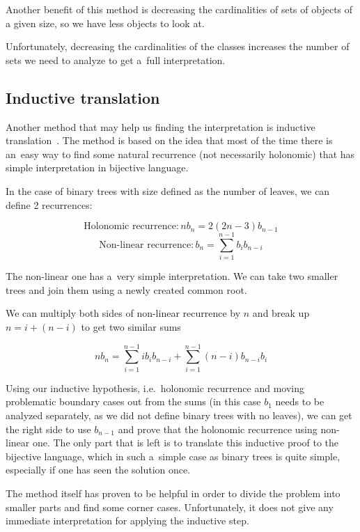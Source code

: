 \documentclass[final]{article}
\theoremstyle{definition}
\theoremstyle{definition}
\theoremstyle{remark}
\begin{document}
Another benefit of this method is decreasing the cardinalities of sets of objects of a given size, so we have less objects to look at.

Unfortunately, decreasing the cardinalities of the classes increases the number of sets we need to analyze to get a~full interpretation.

\subsection{Inductive translation}%
\label{sub:inductive_translation}

Another method that may help us finding the interpretation is inductive translation~\cite{doron}. The method is based on the idea that most of the time there is an~easy way to find some natural recurrence (not necessarily holonomic) that has simple interpretation in bijective language.

In the case of binary trees with size defined as the number of leaves, we can define 2 recurrences:

\[\text{Holonomic recurrence} : n b_{n} = 2 (2n - 3) b_{n - 1}\]
\[\text{Non-linear recurrence} : b_{n} = \sum_{i=1}^{n - 1} b_{i} b_{n - i}\]

The non-linear one has a~very simple interpretation. We can take two smaller trees and join them using a newly created common root.

We can multiply both sides of non-linear recurrence by \(n\) and break up \(n = i + (n - i)\) to get two similar sums

\[n b_{n} = \sum_{i=1}^{n - 1} i b_{i} b_{n - i} + \sum_{i=1}^{n - 1} (n - i) b_{n - i} b_{i}\]

Using our inductive hypothesis, i.e.~holonomic recurrence and moving problematic boundary cases out from the sums (in this case \(b_{1}\) needs to be analyzed separately, as we did not define binary trees with no leaves), we can get the right side to use \(b_{n - 1}\) and prove that the holonomic recurrence using non-linear one. The only part that is left is to translate this inductive proof to the bijective language, which in such a~simple case as binary trees is quite simple, especially if one has seen the solution once.

The method itself has proven to be helpful in order to divide the problem into smaller parts and find some corner cases. Unfortunately, it does not give any immediate interpretation for applying the inductive step.
\end{document}

